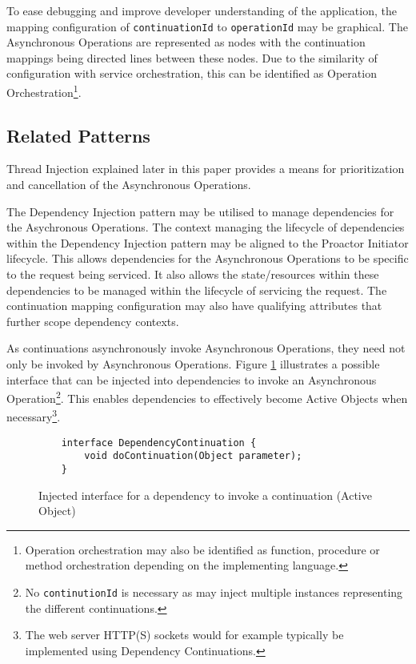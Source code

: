 \documentclass[prodmode]{style/acmlarge}
\begin{document}
To ease debugging and improve developer understanding of the application, the
mapping configuration of \texttt{continuationId}  to \texttt{operationId} may be
graphical.  The Asynchronous Operations are represented as nodes with the
continuation mappings being directed lines between these nodes.  Due to the
similarity of configuration with service orchestration, this can be identified
as Operation Orchestration\footnote{Operation orchestration may also be
identified as function, procedure or method orchestration depending on the
implementing language.}.


\subsection{Related Patterns}

Thread Injection explained later in this paper provides a means for
prioritization and cancellation of the Asynchronous Operations.

The Dependency Injection pattern \cite{ioc} may be utilised to manage
dependencies for the Asychronous Operations.  The context managing the lifecycle
of dependencies within the Dependency Injection pattern may be aligned to the
Proactor Initiator lifecycle.  This allows dependencies for the Asynchronous
Operations to be specific to the request being serviced.  It also allows the
state/resources within these dependencies to be managed within the lifecycle of
servicing the request.  The continuation mapping configuration may also have
qualifying attributes that further scope dependency contexts.

As continuations asynchronously invoke Asynchronous Operations, they need not
only be invoked by Asynchronous Operations. Figure \ref{fig:DC_interface}
illustrates a possible interface that can be injected into dependencies to
invoke an Asynchronous Operation\footnote{No \texttt{continutionId} is necessary
as may inject multiple instances representing the different continuations.}. 
This enables dependencies to effectively become Active Objects
\cite{active-object} when necessary\footnote{The web server HTTP(S) sockets
would for example typically be implemented using Dependency Continuations.}.

\begin{figure}[tp]
\begin{verbatim}
    interface DependencyContinuation {
        void doContinuation(Object parameter);
    }
\end{verbatim}
\caption{Injected interface for a dependency to invoke a continuation (Active Object)}
\label{fig:DC_interface}
\end{figure}
\end{document}
